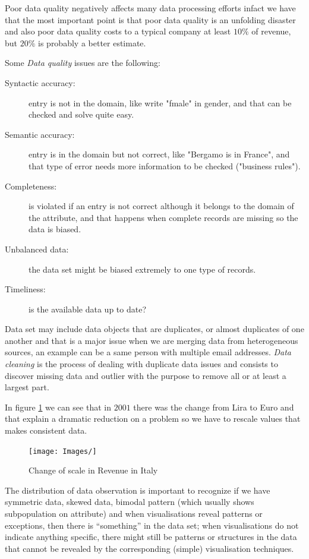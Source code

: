 Poor data quality negatively affects many data processing efforts infact we have that the most important point
is that poor data quality is an unfolding disaster and also poor data quality costs to a typical company
at least $10\%$ of revenue, but $20\%$ is probably a better estimate.

Some \emph{Data quality} issues are the following:
\begin{description}
    \item [Syntactic accuracy: ] entry is not in the domain, like write "fmale" in gender, and that can be 
                                  checked and solve quite easy.
    \item [Semantic accuracy: ] entry is in the domain but not correct, like "Bergamo is in France", and 
                                that type of error needs more information to be checked ("business rules").
    \item [Completeness: ] is violated if an entry is not correct although it belongs to the domain of the attribute,
                           and that happens when complete records are missing so the data is biased.

    \item [Unbalanced data: ] the data set might be biased extremely to one type of records.
    \item [Timeliness: ] is the available data up to date?
\end{description}
Data set may include data objects that are duplicates, or almost duplicates of one another and that is 
a major issue when we are merging data from heterogeneous sources, an example can be a same person with
multiple email addresses.
\emph{Data cleaning} is the process of dealing with duplicate data issues and consists to discover 
missing data and outlier with the purpose to remove all or at least a largest part.

In figure \ref{img:rescale} we can see that in $2001$ there was the change from Lira to Euro and 
that explain a dramatic reduction on a problem so we have to rescale values that makes consistent data.

\begin{figure}
    \caption{Change of scale in Revenue in Italy}
    \label{img:rescale}
    \texttt{[image: Images/]}
\end{figure}

The distribution of data observation is important to recognize if we have symmetric data, skewed data, bimodal
pattern (which usually shows subpopulation on attribute) and when visualisations reveal patterns or exceptions,
then there is “something” in the data set; when visualisations do not indicate anything specific,
there might still be patterns or structures in the data that cannot be revealed by the corresponding
(simple) visualisation techniques.


